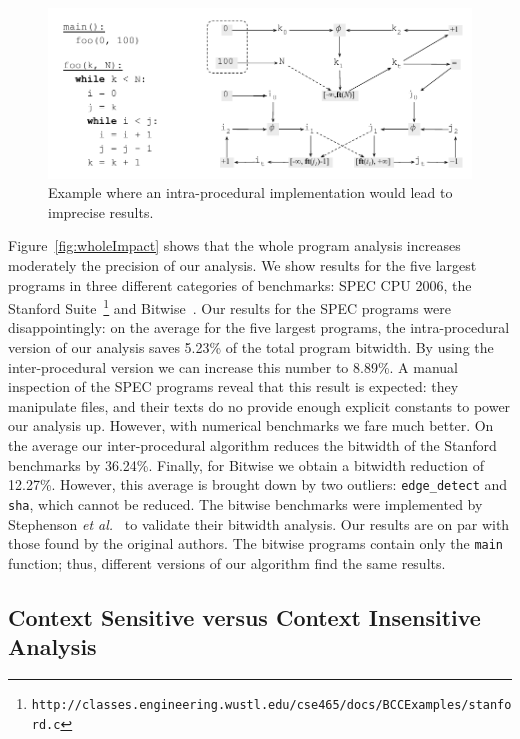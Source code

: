 \documentclass{paper}
\begin{document}
\begin{figure}[t!]
\begin{center}
\includegraphics[width=\textwidth]{images/intra}
\end{center}
\caption{\label{fig:intra}
Example where an intra-procedural implementation would lead to imprecise
results.
}
\end{figure}

Figure~\ref{fig:wholeImpact} shows that the whole program analysis increases
moderately the precision of our analysis.
We show results for the five largest programs in three different categories of
benchmarks: SPEC CPU 2006, the Stanford Suite~\footnote{\texttt{http://classes.engineering.wustl.edu/cse465/docs/BCCExamples/stanford.c}} and
Bitwise~\cite{Stephenson00}.
Our results for the SPEC programs were disappointingly: on the average for
the five largest programs, the intra-procedural version of our analysis saves
5.23\% of the total program bitwidth.
By using the inter-procedural version we can increase this number to 8.89\%.
A manual inspection of the SPEC programs reveal that this result is expected:
they manipulate files, and their texts do no provide enough
explicit constants to power our analysis up.
However, with numerical benchmarks we fare much better.
On the average our inter-procedural algorithm reduces the bitwidth of the
Stanford benchmarks by 36.24\%.
Finally, for Bitwise we obtain a bitwidth reduction of 12.27\%.
However, this average is brought down by two outliers: \texttt{edge\_detect} and
\texttt{sha}, which cannot be reduced.
The bitwise benchmarks were implemented by Stephenson
{\em et al.}~\cite{Stephenson00} to validate their bitwidth analysis.
Our results are on par with those found by the original authors.
The bitwise programs contain only the \texttt{main} function; thus, different
versions of our algorithm find the same results.

\subsection{Context Sensitive versus Context Insensitive Analysis}
\label{sub:context}
\end{document}
